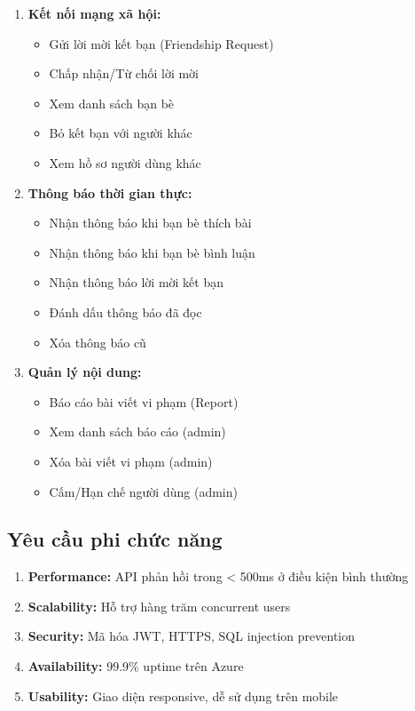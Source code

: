 \begin{enumerate}
    \item \textbf{Kết nối mạng xã hội:}
    \begin{itemize}
        \item Gửi lời mời kết bạn (Friendship Request)
        \item Chấp nhận/Từ chối lời mời
        \item Xem danh sách bạn bè
        \item Bỏ kết bạn với người khác
        \item Xem hồ sơ người dùng khác
    \end{itemize}

    \item \textbf{Thông báo thời gian thực:}
    \begin{itemize}
        \item Nhận thông báo khi bạn bè thích bài
        \item Nhận thông báo khi bạn bè bình luận
        \item Nhận thông báo lời mời kết bạn
        \item Đánh dấu thông báo đã đọc
        \item Xóa thông báo cũ
    \end{itemize}

    \item \textbf{Quản lý nội dung:}
    \begin{itemize}
        \item Báo cáo bài viết vi phạm (Report)
        \item Xem danh sách báo cáo (admin)
        \item Xóa bài viết vi phạm (admin)
        \item Cấm/Hạn chế người dùng (admin)
    \end{itemize}
\end{enumerate}

\subsection{Yêu cầu phi chức năng}
\begin{enumerate}
    \item \textbf{Performance:} API phản hồi trong < 500ms ở điều kiện bình thường
    \item \textbf{Scalability:} Hỗ trợ hàng trăm concurrent users
    \item \textbf{Security:} Mã hóa JWT, HTTPS, SQL injection prevention
    \item \textbf{Availability:} 99.9\% uptime trên Azure
    \item \textbf{Usability:} Giao diện responsive, dễ sử dụng trên mobile
\end{enumerate}

